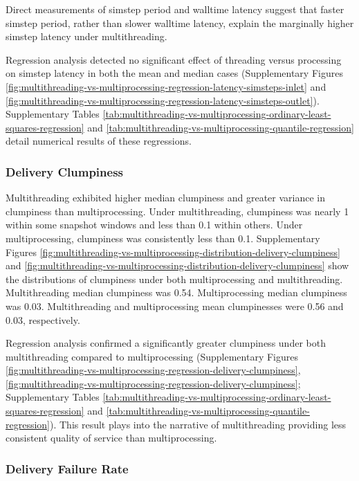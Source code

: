 Direct measurements of simstep period and walltime latency suggest that faster simstep period, rather than slower walltime latency, explain the marginally higher simstep latency under multithreading.

Regression analysis detected no significant effect of threading versus processing on simstep latency in both the mean and median cases (Supplementary Figures \ref{fig:multithreading-vs-multiprocessing-regression-latency-simsteps-inlet} and \ref{fig:multithreading-vs-multiprocessing-regression-latency-simsteps-outlet}).
Supplementary Tables \ref{tab:multithreading-vs-multiprocessing-ordinary-least-squares-regression} and \ref{tab:multithreading-vs-multiprocessing-quantile-regression} detail numerical results of these regressions.

\subsubsection{Delivery Clumpiness}

Multithreading exhibited higher median clumpiness and greater variance in clumpiness than multiprocessing.
Under multithreading, clumpiness was nearly 1 within some snapshot windows and less than 0.1 within others.
Under multiprocessing, clumpiness was consistently less than 0.1.
Supplementary Figures \ref{fig:multithreading-vs-multiprocessing-distribution-delivery-clumpiness} and \ref{fig:multithreading-vs-multiprocessing-distribution-delivery-clumpiness} show the distributions of clumpiness under both multiprocessing and multithreading.
Multithreading median clumpiness was 0.54.
Multiprocessing median clumpiness was 0.03.
Multithreading and multiprocessing mean clumpinesses were 0.56 and 0.03, respectively.

Regression analysis confirmed a significantly greater clumpiness under both multithreading compared to multiprocessing (Supplementary Figures \ref{fig:multithreading-vs-multiprocessing-regression-delivery-clumpiness}, \ref{fig:multithreading-vs-multiprocessing-regression-delivery-clumpiness}; Supplementary Tables \ref{tab:multithreading-vs-multiprocessing-ordinary-least-squares-regression} and \ref{tab:multithreading-vs-multiprocessing-quantile-regression}).
This result plays into the narrative of multithreading providing less consistent quality of service than multiprocessing.

\subsubsection{Delivery Failure Rate}

